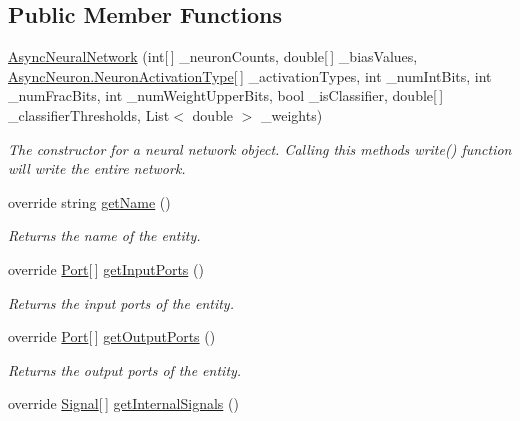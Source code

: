 \subsection*{Public Member Functions}
\begin{DoxyCompactItemize}
\item 
\hyperlink{class_n_n_gen_1_1_async_neural_network_ab9139877c5f02159b52437004c5011ac}{Async\+Neural\+Network} (int\mbox{[}$\,$\mbox{]} \+\_\+neuron\+Counts, double\mbox{[}$\,$\mbox{]} \+\_\+bias\+Values, \hyperlink{class_n_n_gen_1_1_async_neuron_afe8460a52808d1587cbcc0a8e4e23b64}{Async\+Neuron.\+Neuron\+Activation\+Type}\mbox{[}$\,$\mbox{]} \+\_\+activation\+Types, int \+\_\+num\+Int\+Bits, int \+\_\+num\+Frac\+Bits, int \+\_\+num\+Weight\+Upper\+Bits, bool \+\_\+is\+Classifier, double\mbox{[}$\,$\mbox{]} \+\_\+classifier\+Thresholds, List$<$ double $>$ \+\_\+weights)
\begin{DoxyCompactList}\small\item\em The constructor for a neural network object. Calling this method\textquotesingle{}s write() function will write the entire network. \end{DoxyCompactList}\item 
override string \hyperlink{class_n_n_gen_1_1_async_neural_network_affd3f3ffb007593e408d63dccf256238}{get\+Name} ()
\begin{DoxyCompactList}\small\item\em Returns the name of the entity. \end{DoxyCompactList}\item 
override \hyperlink{class_n_n_gen_1_1_port}{Port}\mbox{[}$\,$\mbox{]} \hyperlink{class_n_n_gen_1_1_async_neural_network_a94ad9532f7e80514db3ff3eb16ba42cf}{get\+Input\+Ports} ()
\begin{DoxyCompactList}\small\item\em Returns the input ports of the entity. \end{DoxyCompactList}\item 
override \hyperlink{class_n_n_gen_1_1_port}{Port}\mbox{[}$\,$\mbox{]} \hyperlink{class_n_n_gen_1_1_async_neural_network_a1efde159a323347b01cd88527d61c14e}{get\+Output\+Ports} ()
\begin{DoxyCompactList}\small\item\em Returns the output ports of the entity. \end{DoxyCompactList}\item 
override \hyperlink{class_n_n_gen_1_1_signal}{Signal}\mbox{[}$\,$\mbox{]} \hyperlink{class_n_n_gen_1_1_async_neural_network_a4ef8c71674da4a162680bf5b5c22d928}{get\+Internal\+Signals} ()

\end{DoxyCompactItemize}
